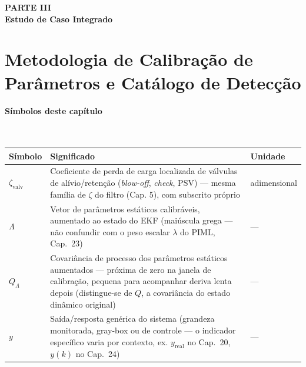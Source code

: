 \documentclass[12pt,a4paper]{article}
\numberwithin{equation}{section}
\numberwithin{table}{section}
\numberwithin{figure}{section}
\begin{document}
{\clearpage
\thispagestyle{empty}
{}
\vspace*{\fill}
\begin{center}
	{\Huge\bfseries PARTE III}\\[2em]
	{\huge\bfseries Estudo de Caso Integrado}
\end{center}
\vspace*{\fill}
\clearpage


\clearpage
\section{Metodologia de Calibração de Parâmetros e Catálogo de Detecção}

\paragraph{Símbolos deste capítulo}\mbox{}\\[-0.5em]
{\small
\begin{longtable}{>{\raggedright\arraybackslash}p{2.6cm} >{\raggedright\arraybackslash}p{9.2cm} >{\raggedright\arraybackslash}p{2.6cm}}
	\toprule
	\textbf{Símbolo} & \textbf{Significado} & \textbf{Unidade} \\ \midrule
	\endhead
	$\zeta_{\text{valv}}$\dag & Coeficiente de perda de carga localizada de válvulas de alívio/retenção (\textit{blow-off}, \textit{check}, PSV) — mesma família de $\zeta$ do filtro (Cap. 5), com subscrito próprio & adimensional \\
	$\Lambda$ & Vetor de parâmetros estáticos calibráveis, aumentado ao estado do EKF (maiúscula grega — não confundir com o peso escalar $\lambda$ do PIML, Cap.~23) & --- \\
	$Q_\Lambda$\dag & Covariância de processo dos parâmetros estáticos aumentados — próxima de zero na janela de calibração, pequena para acompanhar deriva lenta depois (distingue-se de $Q$, a covariância do estado dinâmico original) & --- \\
	$y$ & Saída/resposta genérica do sistema (grandeza monitorada, gray-box ou de controle — o indicador específico varia por contexto, ex. $y_{\text{real}}$ no Cap.~20, $y(k)$ no Cap.~24) & --- \\
	\bottomrule
\end{longtable}
}






}
\end{document}
